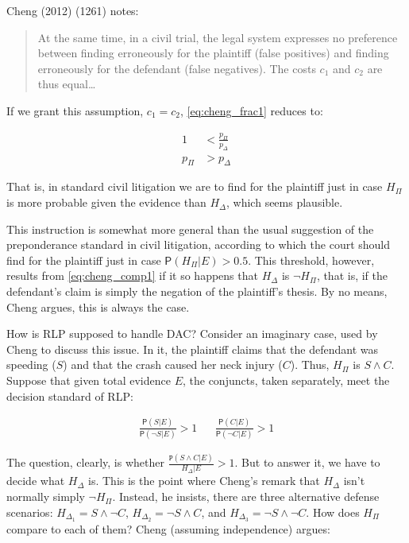\documentclass[10pt,dvipsnames,enabledeprecatedfontcommands]{scrartcl}
\newcommand{\n}{\neg}
\newcommand{\et}{\wedge}
\newcommand{\pr}[1]{\mathsf{P}(#1)}
\begin{document}
\noindent Cheng (2012) (1261) notes:

\begin{quote}
At the same time, in a civil trial, the legal system expresses no preference between finding erroneously for the plaintiff (false positives) and finding erroneously for the defendant (false negatives). The costs $c_1$ and $c_2$ are thus equal\dots
\end{quote}

\noindent If we grant this assumption, \(c_1=c_2\),
\eqref{eq:cheng_frac1} reduces to:

\vspace{-6mm}

\begin{align}
\nonumber 1 &< \frac{p_\Pi}{p_\Delta} \\
\label{eq:cheng_comp1} p_\Pi &> p_\Delta 
\end{align}

\noindent That is, in standard civil litigation we are to find for the
plaintiff just in case \(H_\Pi\) is more probable given the evidence
than \(H_\Delta\), which seems plausible.

This instruction is somewhat more general than the usual suggestion of
the preponderance standard in civil litigation, according to which the
court should find for the plaintiff just in case
\(\pr{H_\Pi\vert E} >0.5\). This threshold, however, results from
\eqref{eq:cheng_comp1} if it so happens that \(H_\Delta\) is
\(\n H_\Pi\), that is, if the defendant's claim is simply the negation
of the plaintiff's thesis. By no means, Cheng argues, this is always the
case.

How is RLP supposed to handle DAC? Consider an imaginary case, used by
Cheng to discuss this issue. In it, the plaintiff claims that the
defendant was speeding (\(S\)) and that the crash caused her neck injury
(\(C\)). Thus, \(H_\Pi\) is \(S\et C\). Suppose that given total
evidence \(E\), the conjuncts, taken separately, meet the decision
standard of RLP:

\begin{align}
 \nonumber 
 \frac{\pr{S\vert E}}{\pr{\n S \vert E}} > 1   & & \frac{\pr{C\vert E}}{\pr{\n C \vert E}} > 1
\end{align}

\noindent The question, clearly, is whether
\(\frac{\mathtt{P}(S\et C\vert E)}{H_\Delta \vert E}>1\). But to answer
it, we have to decide what \(H_\Delta\) is. This is the point where
Cheng's remark that \(H_\Delta\) isn't normally simply \(\n H_\Pi\).
Instead, he insists, there are three alternative defense scenarios:
\(H_{\Delta_1}= S\et \n C\), \(H_{\Delta_2}=\n S \et C\), and
\(H_{\Delta_3}=\n S \et \n C\). How does \(H_\Pi\) compare to each of
them? Cheng (assuming independence) argues:
\end{document}
